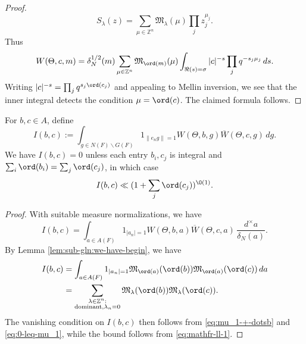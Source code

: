 \begin{proof}
  \begin{equation*}
    S_\lambda(z) = \sum_{\mu \in \mathbb{Z}^n} \mathfrak{M}_{\lambda}(\mu) \prod_j z_j^{\mu_j}.
  \end{equation*}
  Thus
  \begin{equation*}
    W(\Theta,c,m) =
    \delta_N^{1/2}(m)
    \sum_{\mu \in \mathbb{Z}^n}
    \mathfrak{M}_{\ord(m)}(\mu)
    \int_{\Re(s) = \sigma } |c|^{-s} \prod_j q^{-s_j \mu_j} \, d s.
  \end{equation*}
  Writing $|c|^{-s} = \prod_j q^{s_j \ord(c_j)}$ and appealing to Mellin inversion, we see that the inner integral detects the condition $\mu = \ord(c)$.  The claimed formula follows.
\end{proof}

\begin{lemma}\label{lem:sub-gln:b-c-in}
  For $b, c \in A$, define
  \begin{equation*}
    I(b,c) :=
    \int_{g \in N(F) \backslash G(F)}
    1_{\|e_n g\| = 1}
    W  (\Theta, b, g) \overline{W }(\Theta, c, g)
    \, d g.
  \end{equation*}
  We have $I(b,c) = 0$ unless each entry $b_i,c_j$ is integral and $\sum_i \ord(b_i) = \sum_j \ord(c_j)$, in which case
  \begin{equation*}
    I(b,c) \ll (1 + \sum_j \ord(c_j))^{\O(1)}.
  \end{equation*}
\end{lemma}
\begin{proof}
  With suitable measure normalizations, we have
  \begin{equation*}
    I(b,c) =
    \int_{a \in A(F)}
    1_{|a_n| = 1}
    W  (\Theta, b, a) \overline{W }(\Theta, c, a)
    \, \frac{d^\times a}{\delta_N(a)}.
  \end{equation*}
  By Lemma \ref{lem:sub-gln:we-have-begin}, we have
  \begin{align*}
    I(b,c) &=
             \int_{a \in A(F)}
             1 _{|a_n| = 1}
             \mathfrak{M}_{\ord(a)} (\ord (b)) \mathfrak{M} _{\ord (a)} (\ord (c)) \, d a \\
           &=
             \sum_{
             \substack{
             \lambda  \in \mathbb{Z}^n:  \\
    \text{dominant}, \lambda_n = 0
    }
    }
    \mathfrak{M}_{\lambda }(\ord(b))
    \mathfrak{M}_{\lambda }(\ord(c)).
  \end{align*}
  The vanishing condition on $I(b,c)$ then follows from \eqref{eq:mu_1-+-dotsb} and \eqref{eq:0-leq-mu_1}, while the bound follows from \eqref{eq:mathfr-ll-1}.
\end{proof}



